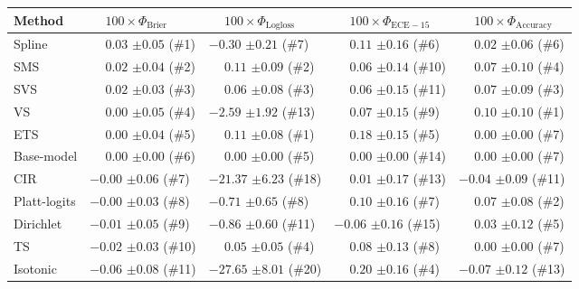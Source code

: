\begin{tabular}{lllll}
\toprule
Method & $\phantom{-} 100 \times \Phi_\mathrm{Brier}$ & $\phantom{-} 100 \times \Phi_\mathrm{Logloss}$ & $\phantom{-} 100 \times \Phi_\mathrm{ECE-15}$ & $\phantom{-} 100 \times \Phi_\mathrm{Accuracy}$ \\
\midrule
Spline & $\phantom{-}0.03$ {\tiny $\pm 0.05$} (\#1) & $-0.30$ {\tiny $\pm 0.21$} (\#7) & $\phantom{-}0.11$ {\tiny $\pm 0.16$} (\#6) & $\phantom{-}0.02$ {\tiny $\pm 0.06$} (\#6) \\
SMS & $\phantom{-}0.02$ {\tiny $\pm 0.04$} (\#2) & $\phantom{-}0.11$ {\tiny $\pm 0.09$} (\#2) & $\phantom{-}0.06$ {\tiny $\pm 0.14$} (\#10) & $\phantom{-}0.07$ {\tiny $\pm 0.10$} (\#4) \\
SVS & $\phantom{-}0.02$ {\tiny $\pm 0.03$} (\#3) & $\phantom{-}0.06$ {\tiny $\pm 0.08$} (\#3) & $\phantom{-}0.06$ {\tiny $\pm 0.15$} (\#11) & $\phantom{-}0.07$ {\tiny $\pm 0.09$} (\#3) \\
VS & $\phantom{-}0.00$ {\tiny $\pm 0.05$} (\#4) & $-2.59$ {\tiny $\pm 1.92$} (\#13) & $\phantom{-}0.07$ {\tiny $\pm 0.15$} (\#9) & $\phantom{-}0.10$ {\tiny $\pm 0.10$} (\#1) \\
ETS & $\phantom{-}0.00$ {\tiny $\pm 0.04$} (\#5) & $\phantom{-}0.11$ {\tiny $\pm 0.08$} (\#1) & $\phantom{-}0.18$ {\tiny $\pm 0.15$} (\#5) & $\phantom{-}0.00$ {\tiny $\pm 0.00$} (\#7) \\
Base-model & $\phantom{-}0.00$ {\tiny $\pm 0.00$} (\#6) & $\phantom{-}0.00$ {\tiny $\pm 0.00$} (\#5) & $\phantom{-}0.00$ {\tiny $\pm 0.00$} (\#14) & $\phantom{-}0.00$ {\tiny $\pm 0.00$} (\#7) \\
CIR & $-0.00$ {\tiny $\pm 0.06$} (\#7) & $-21.37$ {\tiny $\pm 6.23$} (\#18) & $\phantom{-}0.01$ {\tiny $\pm 0.17$} (\#13) & $-0.04$ {\tiny $\pm 0.09$} (\#11) \\
Platt-logits & $-0.00$ {\tiny $\pm 0.03$} (\#8) & $-0.71$ {\tiny $\pm 0.65$} (\#8) & $\phantom{-}0.10$ {\tiny $\pm 0.16$} (\#7) & $\phantom{-}0.07$ {\tiny $\pm 0.08$} (\#2) \\
Dirichlet & $-0.01$ {\tiny $\pm 0.05$} (\#9) & $-0.86$ {\tiny $\pm 0.60$} (\#11) & $-0.06$ {\tiny $\pm 0.16$} (\#15) & $\phantom{-}0.03$ {\tiny $\pm 0.12$} (\#5) \\
TS & $-0.02$ {\tiny $\pm 0.03$} (\#10) & $\phantom{-}0.05$ {\tiny $\pm 0.05$} (\#4) & $\phantom{-}0.08$ {\tiny $\pm 0.13$} (\#8) & $\phantom{-}0.00$ {\tiny $\pm 0.00$} (\#7) \\
Isotonic & $-0.06$ {\tiny $\pm 0.08$} (\#11) & $-27.65$ {\tiny $\pm 8.01$} (\#20) & $\phantom{-}0.20$ {\tiny $\pm 0.16$} (\#4) & $-0.07$ {\tiny $\pm 0.12$} (\#13) \\

\end{tabular}
